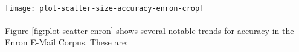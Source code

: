\paragraph*{}
	\begin{sidewaysfigure}[htbp!]
		\begin{center}
		\centering
		\texttt{[image: plot-scatter-size-accuracy-enron-crop]}
		\caption{Scatter-Plot of Enron Email Corpus Tests}
		\label{fig:plot-scatter-enron}
		\end{center}
	\end{sidewaysfigure}
	
\paragraph*{} Figure \ref{fig:plot-scatter-enron} shows several notable trends for accuracy in the Enron E-Mail Corpus.  These are:
